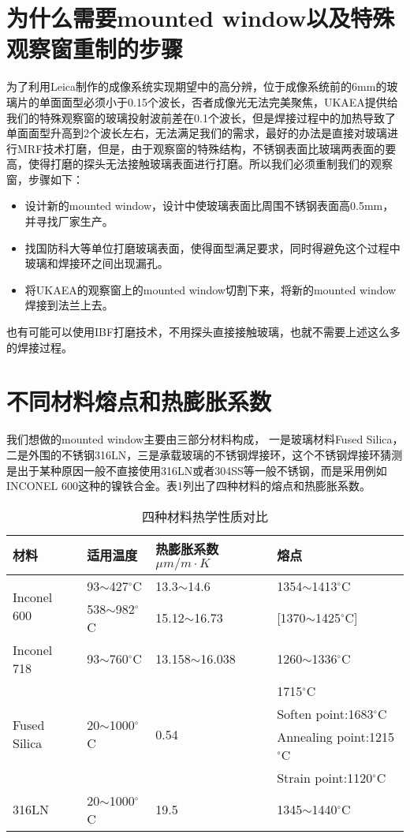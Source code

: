 \documentclass[onecolumn,a4paper,10pt]{article}
\begin{document}
\section{为什么需要mounted window以及特殊观察窗重制的步骤}

为了利用Leica制作的成像系统实现期望中的高分辨，位于成像系统前的6mm的玻璃片的单面面型必须小于0.15个波长，否者成像光无法完美聚焦，UKAEA提供给我们的特殊观察窗的玻璃投射波前差在0.1个波长，但是焊接过程中的加热导致了单面面型升高到2个波长左右，无法满足我们的需求，最好的办法是直接对玻璃进行MRF技术打磨，但是，由于观察窗的特殊结构，不锈钢表面比玻璃两表面的要高，使得打磨的探头无法接触玻璃表面进行打磨。所以我们必须重制我们的观察窗，步骤如下：
\begin{itemize}
\item 设计新的mounted window，设计中使玻璃表面比周围不锈钢表面高0.5mm，并寻找厂家生产。
\item 找国防科大等单位打磨玻璃表面，使得面型满足要求，同时得避免这个过程中玻璃和焊接环之间出现漏孔。
\item 将UKAEA的观察窗上的mounted window切割下来，将新的mounted window焊接到法兰上去。
\end{itemize}

也有可能可以使用IBF打磨技术，不用探头直接接触玻璃，也就不需要上述这么多的焊接过程。

\section{不同材料熔点和热膨胀系数}

我们想做的mounted window主要由三部分材料构成， 一是玻璃材料Fused Silica，二是外围的不锈钢316LN，三是承载玻璃的不锈钢焊接环，这个不锈钢焊接环猜测是出于某种原因一般不直接使用316LN或者304SS等一般不锈钢，而是采用例如INCONEL 600这种的镍铁合金。表1列出了四种材料的熔点和热膨胀系数。
\begin{table}[htbp]
\renewcommand\arraystretch{1.6}
\centering
\caption{四种材料热学性质对比}
\begin{tabular}{p{70pt}|p{100pt}|p{100pt}|p{100pt}}
\hline
材料 &适用温度&热膨胀系数$\mu m/m\cdot K$&熔点\\
\hline
\multirow{2}{*}{Inconel 600}  &93$\sim$427$^{\circ}$C &13.3$\sim$14.6 &1354$\sim$1413$^{\circ}$C  \\
\cmidrule{2-3}
&538$\sim$982$^{\circ}$C & 15.12$\sim$16.73 & [1370$\sim$1425$^{\circ}$C]\\
\hline
Inconel 718  &93$\sim$760$^{\circ}$C &13.158$\sim$16.038 &1260$\sim$1336$^{\circ}$C  \\
\hline
\multirow{4}{*}{Fused Silica} & \multirow{4}{*}{20$\sim$1000$^{\circ}$C} & \multirow{4}{*}{0.54} & 
1715$^{\circ}$C\\
&&&Soften point:1683$^{\circ}$C\\
&&&Annealing point:1215$^{\circ}$C\\
&&&Strain point:1120$^{\circ}$C\\
\hline
316LN &20$\sim$1000$^{\circ}$C &19.5&1345$\sim$1440$^{\circ}$C\\
\hline
\end{tabular}
\end{table}
\end{document}
